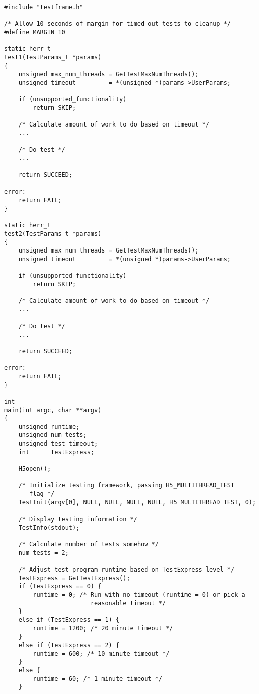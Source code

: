 \documentclass[../HDF5_RFC.tex]{subfiles}
\begin{document}
\begin{verbatim}
#include "testframe.h"

/* Allow 10 seconds of margin for timed-out tests to cleanup */
#define MARGIN 10

static herr_t
test1(TestParams_t *params)
{
    unsigned max_num_threads = GetTestMaxNumThreads();
    unsigned timeout         = *(unsigned *)params->UserParams;

    if (unsupported_functionality)
        return SKIP;

    /* Calculate amount of work to do based on timeout */
    ...

    /* Do test */
    ...

    return SUCCEED;

error:
    return FAIL;
}

static herr_t
test2(TestParams_t *params)
{
    unsigned max_num_threads = GetTestMaxNumThreads();
    unsigned timeout         = *(unsigned *)params->UserParams;

    if (unsupported_functionality)
        return SKIP;

    /* Calculate amount of work to do based on timeout */
    ...

    /* Do test */
    ...

    return SUCCEED;

error:
    return FAIL;
}

int
main(int argc, char **argv)
{
    unsigned runtime;
    unsigned num_tests;
    unsigned test_timeout;
    int      TestExpress;

    H5open();

    /* Initialize testing framework, passing H5_MULTITHREAD_TEST
       flag */
    TestInit(argv[0], NULL, NULL, NULL, NULL, H5_MULTITHREAD_TEST, 0);

    /* Display testing information */
    TestInfo(stdout);

    /* Calculate number of tests somehow */
    num_tests = 2;

    /* Adjust test program runtime based on TestExpress level */
    TestExpress = GetTestExpress();
    if (TestExpress == 0) {
        runtime = 0; /* Run with no timeout (runtime = 0) or pick a
                        reasonable timeout */
    }
    else if (TestExpress == 1) {
        runtime = 1200; /* 20 minute timeout */
    }
    else if (TestExpress == 2) {
        runtime = 600; /* 10 minute timeout */
    }
    else {
        runtime = 60; /* 1 minute timeout */
    }


\end{verbatim}
\end{document}
